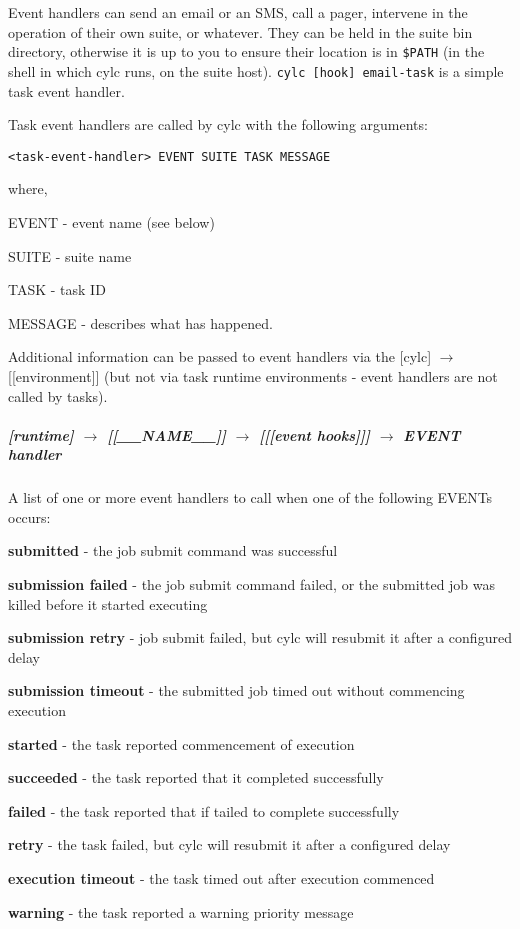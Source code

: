 Event handlers can send an email or an SMS, call a pager, intervene
in the operation of their own suite, or whatever.
They can be held in the suite bin directory, otherwise it is up to you
to ensure their location is in \lstinline=$PATH= (in the shell in which
cylc runs, on the suite host).
\lstinline=cylc [hook] email-task= is a simple task event handler.

Task event handlers are called by cylc with the following arguments:
\begin{lstlisting}
<task-event-handler> EVENT SUITE TASK MESSAGE
\end{lstlisting}
where,
\begin{myitemize}
    \item EVENT - event name (see below)
    \item SUITE - suite name
    \item TASK  - task ID
    \item MESSAGE - describes what has happened.
\end{myitemize}

Additional information can be passed to event handlers via the
[cylc] $\rightarrow$ [[environment]] (but not via task
runtime environments - event handlers are not called by tasks).

\subparagraph[EVENT handler]{[runtime] $\rightarrow$ [[\_\_NAME\_\_]] $\rightarrow$ [[[event hooks]]] $\rightarrow$ EVENT handler}

A list of one or more event handlers to call when one of the following EVENTs occurs:
\begin{myitemize}
    \item {\bf submitted}      - the job submit command was successful
    \item {\bf submission failed}  - the job submit command failed, or the
                                   submitted job was killed before it started executing
    \item {\bf submission retry}   - job submit failed, but cylc will resubmit it
                                   after a configured delay
    \item {\bf submission timeout} - the submitted job timed out without commencing execution

    \item {\bf started}        - the task reported commencement of execution
    \item {\bf succeeded}      - the task reported that it completed successfully
    \item {\bf failed}         - the task reported that if tailed to complete successfully
    \item {\bf retry}          - the task failed, but cylc will resubmit it
                                  after a configured delay
    \item {\bf execution timeout}        - the task timed out after execution commenced
    \item {\bf warning}        - the task reported a warning priority message
\end{myitemize}

